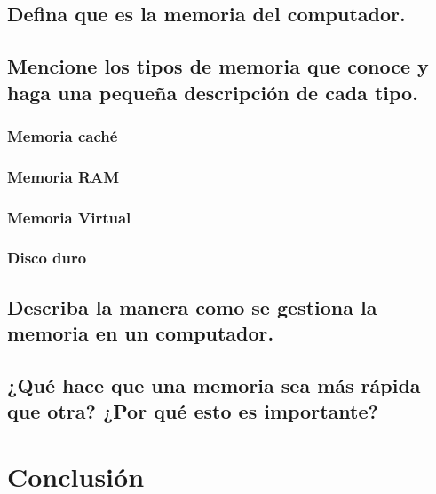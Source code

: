 \documentclass{article}
\begin{document}
\subsection{Defina que es la memoria del computador.}
\subsection{Mencione los tipos de memoria que conoce y haga una pequeña descripción de cada tipo.}
\subsubsection{Memoria caché}
\subsubsection{Memoria RAM}
\subsubsection{Memoria Virtual}
\subsubsection{Disco duro}

\subsection{Describa la manera como se gestiona la memoria en un computador.}
\subsection{¿Qué hace que una memoria sea más rápida que otra? ¿Por qué esto es importante?}

\section{Conclusión} \label{conclulsion}



\end{document}

